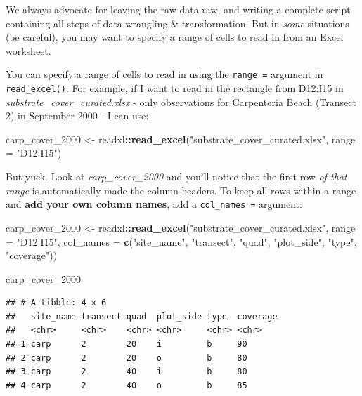 \documentclass[]{book}
\newenvironment{Shaded}{\begin{snugshade}}{\end{snugshade}}
\newcommand{\DataTypeTok}[1]{\textcolor[rgb]{0.13,0.29,0.53}{#1}}
\newcommand{\DecValTok}[1]{\textcolor[rgb]{0.00,0.00,0.81}{#1}}
\newcommand{\KeywordTok}[1]{\textcolor[rgb]{0.13,0.29,0.53}{\textbf{#1}}}
\newcommand{\NormalTok}[1]{#1}
\newcommand{\OperatorTok}[1]{\textcolor[rgb]{0.81,0.36,0.00}{\textbf{#1}}}
\newcommand{\StringTok}[1]{\textcolor[rgb]{0.31,0.60,0.02}{#1}}
\begin{document}
We always advocate for leaving the raw data raw, and writing a complete script containing all steps of data wrangling \& transformation. But in \emph{some} situations (be careful), you may want to specify a range of cells to read in from an Excel worksheet.

You can specify a range of cells to read in using the \texttt{range\ =} argument in \texttt{read\_excel()}. For example, if I want to read in the rectangle from D12:I15 in \emph{substrate\_cover\_curated.xlsx} - only observations for Carpenteria Beach (Transect 2) in September 2000 - I can use:

\begin{Shaded}
\begin{Highlighting}[]
\NormalTok{carp_cover_}\DecValTok{2000}\NormalTok{ <-}\StringTok{ }\NormalTok{readxl}\OperatorTok{::}\KeywordTok{read_excel}\NormalTok{(}\StringTok{"substrate_cover_curated.xlsx"}\NormalTok{, }\DataTypeTok{range =} \StringTok{"D12:I15"}\NormalTok{)}
\end{Highlighting}
\end{Shaded}

But yuck. Look at \emph{carp\_cover\_2000} and you'll notice that the first row \emph{of that range} is automatically made the column headers. To keep all rows within a range and \textbf{add your own column names}, add a \texttt{col\_names\ =} argument:

\begin{Shaded}
\begin{Highlighting}[]
\NormalTok{carp_cover_}\DecValTok{2000}\NormalTok{ <-}\StringTok{ }\NormalTok{readxl}\OperatorTok{::}\KeywordTok{read_excel}\NormalTok{(}\StringTok{"substrate_cover_curated.xlsx"}\NormalTok{, }\DataTypeTok{range =} \StringTok{"D12:I15"}\NormalTok{, }\DataTypeTok{col_names =} \KeywordTok{c}\NormalTok{(}\StringTok{"site_name"}\NormalTok{, }\StringTok{"transect"}\NormalTok{, }\StringTok{"quad"}\NormalTok{, }\StringTok{"plot_side"}\NormalTok{, }\StringTok{"type"}\NormalTok{, }\StringTok{"coverage"}\NormalTok{))}
\end{Highlighting}
\end{Shaded}

\begin{Shaded}
\begin{Highlighting}[]
\NormalTok{carp_cover_}\DecValTok{2000}
\end{Highlighting}
\end{Shaded}

\begin{verbatim}
## # A tibble: 4 x 6
##   site_name transect quad  plot_side type  coverage
##   <chr>     <chr>    <chr> <chr>     <chr> <chr>   
## 1 carp      2        20    i         b     90      
## 2 carp      2        20    o         b     80      
## 3 carp      2        40    i         b     80      
## 4 carp      2        40    o         b     85
\end{verbatim}
\end{document}

